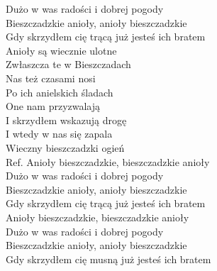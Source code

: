 \begin{flushleft}
\hspace{0.9cm}Dużo w was radości i dobrej pogody \\
\hspace{0.9cm}Bieszczadzkie anioły, anioły bieszczadzkie \\
\hspace{0.9cm}Gdy skrzydłem cię trącą już jesteś ich bratem \\
\newpage
Anioły są wiecznie ulotne \\
Zwłaszcza te w Bieszczadach \\
Nas też czasami nosi \\
Po ich anielskich śladach \\
One nam przyzwalają \\
I skrzydłem wskazują drogę \\
I wtedy w nas się zapala \\
Wieczny bieszczadzki ogień \\
\vskip 3mm
Ref. Anioły bieszczadzkie, bieszczadzkie anioły \\
\hspace{0.9cm}Dużo w was radości i dobrej pogody \\
\hspace{0.9cm}Bieszczadzkie anioły, anioły bieszczadzkie \\
\hspace{0.9cm}Gdy skrzydłem cię trącą już jesteś ich bratem \\
\vskip 3mm
\hspace{0.9cm}Anioły bieszczadzkie, bieszczadzkie anioły \\
\hspace{0.9cm}Dużo w was radości i dobrej pogody \\
\hspace{0.9cm}Bieszczadzkie anioły, anioły bieszczadzkie \\
\hspace{0.9cm}Gdy skrzydłem cię musną już jesteś ich bratem \\
\end{flushleft}
\clearpage

